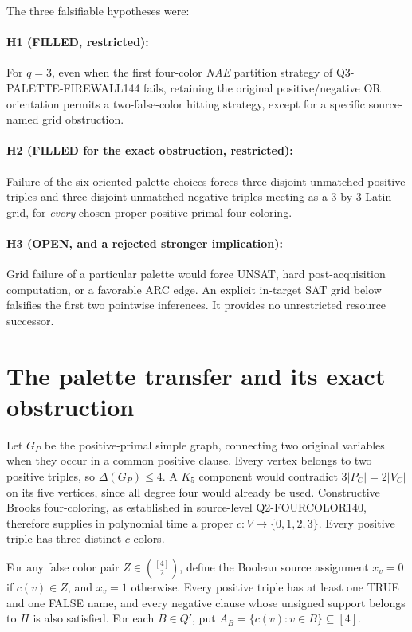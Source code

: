 \documentclass[11pt]{article}
\begin{document}
The three falsifiable hypotheses were:
\paragraph{H1 (FILLED, restricted):}
For $q=3$, even when the first four-color \emph{NAE} partition strategy of
Q3-PALETTE-FIREWALL144 fails, retaining the original positive/negative OR
orientation permits a two-false-color hitting strategy, except for a
specific source-named grid obstruction.
\paragraph{H2 (FILLED for the exact obstruction, restricted):}
Failure of the six oriented palette choices forces three disjoint
unmatched positive triples and three disjoint unmatched negative triples
meeting as a $3$-by-$3$ Latin grid, for \emph{every} chosen proper
positive-primal four-coloring.
\paragraph{H3 (OPEN, and a rejected stronger implication):}
Grid failure of a particular palette would force UNSAT, hard
post-acquisition computation, or a favorable ARC edge. An explicit
in-target SAT grid below falsifies the first two pointwise inferences.
It provides no unrestricted resource successor.

\section{The palette transfer and its exact obstruction}
Let $G_P$ be the positive-primal simple graph, connecting two original
variables when they occur in a common positive clause. Every vertex
belongs to two positive triples, so $\Delta(G_P)\le4$. A $K_5$ component
would contradict $3|P_C|=2|V_C|$ on its five vertices, since all degree
four would already be used. Constructive Brooks four-coloring, as
established in source-level Q2-FOURCOLOR140, therefore supplies in
polynomial time a proper $c:V\to\{0,1,2,3\}$. Every positive triple has
three distinct $c$-colors.

For any false color pair $Z\in {[4]\choose2}$, define the Boolean
source assignment $x_v=0$ if $c(v)\in Z$, and $x_v=1$ otherwise.
Every positive triple has at least one TRUE and one FALSE name, and
every negative clause whose unsigned support belongs to $H$ is also
satisfied. For each $B\in Q'$, put
$A_B=\{c(v):v\in B\}\subseteq[4]$.
\end{document}
